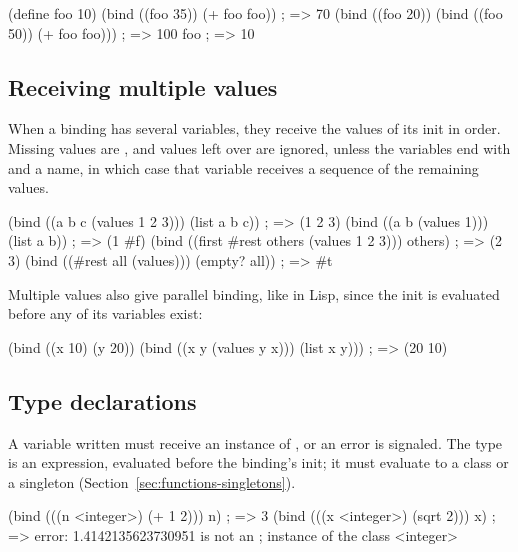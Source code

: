 \begin{dylan}
(define foo 10)
(bind ((foo 35))
  (+ foo foo))            ; => 70
(bind ((foo 20))
  (bind ((foo 50))
    (+ foo foo)))         ; => 100
foo                       ; => 10
\end{dylan}

\subsection{Receiving multiple values}

When a binding has several variables, they receive the values of its init
in order. Missing values are , and values left over are ignored,
unless the variables end with  and a name, in which case that
variable receives a sequence of the remaining values.

\begin{dylan}
(bind ((a b c (values 1 2 3)))
  (list a b c))           ; => (1 2 3)
(bind ((a b (values 1)))
  (list a b))             ; => (1 #f)
(bind ((first #rest others (values 1 2 3)))
  others)                 ; => (2 3)
(bind ((#rest all (values)))
  (empty? all))           ; => #t
\end{dylan}

\noindent Multiple values also give parallel binding, like  in
Lisp, since the init is evaluated before any of its variables exist:

\begin{dylan}
(bind ((x 10) (y 20))
  (bind ((x y (values y x)))
    (list x y)))          ; => (20 10)
\end{dylan}

\subsection{Type declarations}\label{sec:control-bind-types}

A variable written  must receive an
instance of , or an error is signaled. The type is an
expression, evaluated before the binding's init; it must evaluate to a class
or a singleton (Section~\ref{sec:functions-singletons}).

\begin{dylan}
(bind (((n <integer>) (+ 1 2)))
  n)                      ; => 3
(bind (((x <integer>) (sqrt 2)))
  x)                      ; => error: 1.4142135623730951 is not an
                          ;    instance of {the class <integer>}
\end{dylan}


